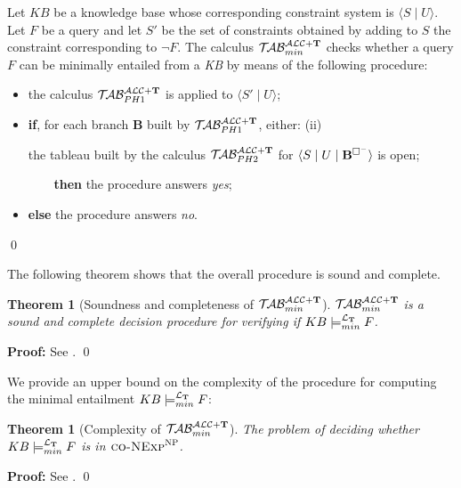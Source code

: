 \documentclass[a4paper, 11pt, oneside]{duthesis}
\newcommand{\tip}{{\bf T}}
\newcommand{\nott} {\lnot}
\newcommand{\tc} {\mid}
\newcommand{\bbox}{\square}
\newcommand{\sx} {\langle}
\newcommand{\dx} {\rangle}
\newcommand{\ellet} {\mathcal{L}_{\bf T}}
\newcommand{\nuovoc}{\mathrel{{\mathcal{T}\!\mathcal{AB}}}_{min}^{\mathcal{ALC}+\mbox{\scriptsize $\tip$}}}
\newcommand{\primo}{\mathrel{{\mathcal{T}\!\mathcal{AB}}}_{PH 1}^{\mathcal{ALC}+\mbox{\scriptsize $\tip$}}}
\newcommand{\secondo}{\mathrel{{\mathcal{T}\!\mathcal{AB}}}_{PH 2}^{\mathcal{ALC}+\mbox{\scriptsize $\tip$}}}
\newenvironment{proof}
{\begin{trivlist} \item[] {\bf Proof:}}%
{\qed \end{trivlist}}
\newenvironment{definition}
{\begin{defi} \rm}{\qed \end{defi}}
\newenvironment{proof}
{\begin{trivlist} \item[] {\bf Proof:}}%
{\qed \end{trivlist}}
\newenvironment{definition}
{\begin{defi} \rm}{\qed \end{defi}}
\newtheorem{theorem}{Theorem}
\newtheorem{definition}{Definition}
\newcounter{posu}
\newtheorem{theorem}[posu]{Theorem}
\newtheorem{definition}[posu]{Definition}
\newtheorem{proof}[posu]{Proof}
\begin{document}
\begin{definition}\label{def processo}
Let $KB$ be a knowledge base whose corresponding constraint system is $\sx S \tc U \dx$. Let $F$ be a query and let $S'$ be the set of constraints obtained by adding to $S$ the constraint corresponding to $\nott F$.
The calculus $\nuovoc$ checks whether a query $F$ can be minimally entailed from a \emph{KB} by means of the following procedure:
\begin{itemize}
\item the calculus $\primo$ is applied to $\sx S' \tc U \dx$;
\item \textbf{if}, for each branch {\bf B} built by $\primo$, either:
	\subitem(ii) {the tableau built by the calculus $\secondo$ for $\sx S \tc U \tc {\bf
B}^{\bbox^{-}} \dx$ is open;

\verb$    $\textbf{then} the procedure answers \emph{yes};}
\item[] \textbf{else} the procedure answers \emph{no}.
\end{itemize}
\end{definition}

\noindent The following theorem shows that the overall procedure is sound and complete.

\begin{theorem}[Soundness and completeness of $\nuovoc$]\label{Soundness e completeness nuovoc} $\nuovoc$ is  a sound and complete decision procedure for verifying if $KB \models_{min}^{\ellet} F$.
\end{theorem}

\begin{proof}
See \cite{Giordano:2013:NDL:2435476.2435957}.
\end{proof}

We provide an upper bound on the complexity of the procedure for computing the minimal entailment $KB \models_{min}^{\ellet} F$:

\begin{theorem}[Complexity of $\nuovoc$]\label{overall_complexity}
The problem of deciding whether $KB \models_{min}^{\ellet} F$ is in $\textsc{co-NExp}^\textsc{NP}$.
\end{theorem}

\begin{proof}
See \cite{Giordano:2013:NDL:2435476.2435957}.
\end{proof}

\newpage
\end{document}
